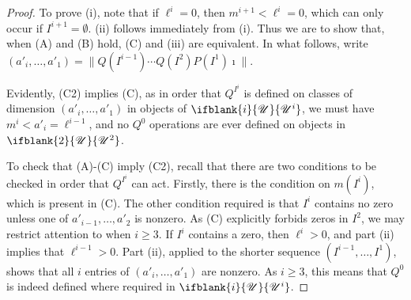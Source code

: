 \documentclass[10pt]{article}
\newcommand{\nontop}[1]{\ifblank{#1}{\scrU}{\scrU^{#1}}}
\renewcommand{\Q}{Q}
\newcommand{\SqShift}{\Sq_{+}}
\newcommand{\Sq}{\mathrm{Sq}}
\newcommand{\minDim}{m}
\begin{document}
\begin{SequenceOfSequencesIntro}
\begin{proof}
To prove (i), note that if $\ell^i=0$, then $\minDim^{i+1}<\ell^i=0$, which can only occur if $I^{i+1}=\emptyset$. (ii) follows immediately from (i). Thus we are to show that, when \textup{(A)} and \textup{(B)} hold, \textup{(C)} and (iii) are equivalent. In what follows, write $(a'_i,\ldots,a'_1)=\|\Q(I^{i-1})\cdots \Q(I^2)P(I^1)\imath\|$.

Evidently, \textup{(C2)} implies \textup{(C)}, as in  order that $\Q^{I^i}$ is defined on classes of dimension $(a'_i,\ldots,a'_1)$ in objects of $\nontop{i}$, we must have $\minDim^i<a'_i=\ell^{i-1}$, and no $\Q^0$ operations are ever defined on objects in $\nontop{2}$.

To check that \textup{(A)}-\textup{(C)} imply \textup{(C2)}, recall that there are two conditions to be checked in order that $\Q^{I^i}$ can act. Firstly, there is the condition on $\minDim(I^i)$, which is present in \textup{(C)}. The other condition required is that $I^i$ contains no zero unless one of $a'_{i-1},\ldots,a'_{2}$ is nonzero.
As \textup{(C)} explicitly forbids zeros in $I^2$, we may restrict attention to when $i\geq3$. %
If $I^i$ contains a zero, then $\ell^i>0$, and part (ii) implies that $\ell^{i-1}>0$. Part (ii), applied to the shorter sequence $(I^{i-1},\ldots,I^1)$, shows that all $i$ entries of $(a'_i,\ldots,a'_1)$ are nonzero. As $i\geq3$, this means that $\Q^0$ is indeed defined where required in $\nontop{i}$.
%
\end{proof}


\end{SequenceOfSequencesIntro}
\end{document}
